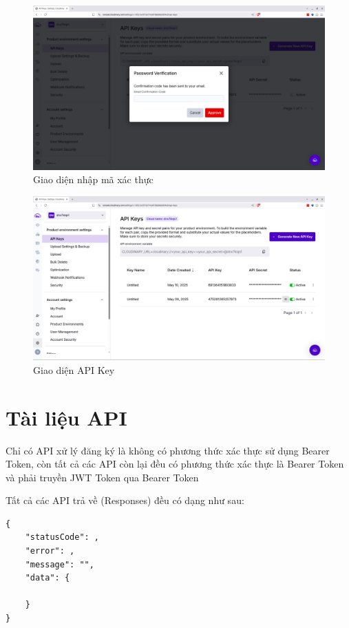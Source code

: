 \documentclass[../BTL.tex]{subfiles}
\begin{document}
\begin{figure}
    \centering
    \includegraphics[width=1\linewidth]{Hinhve/cloudinary-email-verification.png}
    \caption{ Giao diện nhập mã xác thực}
    \label{fig:cloudinary-email-verification}
\end{figure}
\begin{figure}
    \centering
    \includegraphics[width=1\linewidth]{Hinhve/cloudinary-api-key.png}
    \caption{ Giao diện API Key}
    \label{fig:cloudinary-api-key}
\end{figure}
\section{ Tài liệu API}
Chỉ có API xử lý đăng ký là không có phương thức xác thực sử dụng Bearer Token, còn tất cả các API còn lại đều có phương thức xác thực là Bearer Token và phải truyền JWT Token qua Bearer Token

Tất cả các API trả về (Responses) đều có dạng như sau:
\begin{verbatim}
{
    "statusCode": ,
    "error": ,
    "message": "",
    "data": {
        
    }
}
\end{verbatim}
\end{document}
